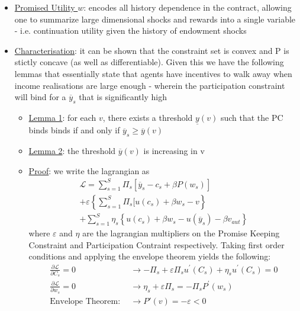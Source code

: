 \documentclass{article}
\begin{document}
\begin{itemize}
\begin{itemize}
        \begin{itemize}
            \item \underline{Promised Utility $w$}: encodes all history dependence in the contract, allowing one to summarize large dimensional shocks and rewards into a single variable - i.e. continuation utility given the history of endowment shocks
            \item  \underline{Characterisation}: it can be shown that the constraint set is convex and P is stictly concave (as well as differentiable). Given this we have the following lemmas that essentially state that agents have incentives to walk away when income realisations are large enough - wherein the participation constraint will bind for a $\overline{y}_{s}$ that is significantly high
            \begin{itemize}
                \item \underline{Lemma 1}: for each $v$, there exists a threshold $\underline{y}(v)$ such that the PC binds binds if and only if $\overline{y}_{s} \geq \overline{y}(v)$
                \item  \underline{Lemma 2}: the threshold $\overline{y}(v)$ is increasing in v
                \item  \underline{Proof}: we write the lagrangian as
                \begin{gather*}
                    \mathcal{L} = \sum_{s=1}^{S} \Pi_{s} [\overline{y}_{s} - c_{s} + \beta P(w_{s})] \\ + \varepsilon \left\{ \sum_{s=1}^{S} \Pi_{s} [u(c_{s}) + \beta w_{s} - v \right\} \\ +  \sum_{s=1}^{S} \eta_{s} \left\{ u(c_{s}) + \beta w_{s} - u(\overline{y}_{s}) - \beta v_{aut} \right\}
                \end{gather*}
                where $\varepsilon$ and $\eta$ are the lagrangian multipliers on the Promise Keeping Constraint and Participation Contraint respectively. Taking first order conditions and applying the envelope theorem yields the following:
                \begin{align*}
                    \frac{\partial \mathcal{L}}{\partial C_{s}} = 0 &\rightarrow -\Pi_{s} + \varepsilon \Pi_{s} u^{'}(C_{s}) + \eta_{s} u^{'} (C_{s}) = 0 \tag{(1)} \\
                    \frac{\partial \mathcal{L}}{\partial w_{s}} = 0 &\rightarrow \eta_{s} + \varepsilon \Pi_{s} = - \Pi_{s}P^{'}(w_{s}) \tag{(2)} \\
                    \text{Envelope Theorem}: \ \ &\rightarrow P'(v) = - \varepsilon < 0 \tag{(3)}

\end{align*}
\end{itemize}
\end{itemize}
\end{itemize}
\end{itemize}
\end{document}
